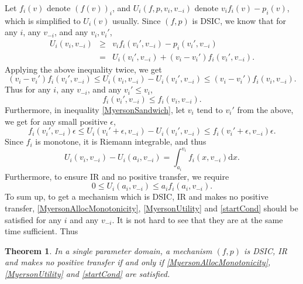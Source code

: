 \documentclass[openany]{book}
\newtheorem{theorem}{Theorem}[chapter]
\theoremstyle{remark}
\begin{document}
Let $f_i(v)$ denote $(f(v))_i$, and $U_i(f,p,v_i,v_{-i})$ denote $v_if_i(v)-p_i(v)$, which is simplified to $U_i(v)$ usually. Since $(f,p)$ is DSIC, we know that for any $i$, any $v_{-i}$, and any $v_i,v_i'$,
\begin{equation*}
    \begin{array}{rcl}
        U_i(v_i,v_{-i}) & \ge & v_if_i(v_i',v_{-i})-p_i(v_i',v_{-i}) \\
         & = & U_i(v_i',v_{-i})+(v_i-v_i')f_i(v_i',v_{-i}).
    \end{array}
\end{equation*}
Applying the above inequality twice, we get
\begin{equation}\label{MyersonSandwich}
    (v_i-v_i')f_i(v_i',v_{-i})\le U_i(v_i,v_{-i})-U_i(v_i',v_{-i})\le(v_i-v_i')f_i(v_i,v_{-i}).
\end{equation}
Thus for any $i$, any $v_{-i}$, and any $v_i'\le v_i$,
\begin{equation}\label{MyersonAllocMonotonicity}
    f_i(v_i',v_{-i})\le f_i(v_i,v_{-i}).
\end{equation}
Furthermore, in inequality \eqref{MyersonSandwich}, let $v_i$ tend to $v_i'$ from the above, we get for any small positive $\epsilon$,
\begin{equation*}
    f_i(v_i',v_{-i})\epsilon\le U_i(v_i'+\epsilon,v_{-i})-U_i(v_i',v_{-i})\le f_i(v_i'+\epsilon,v_{-i})\epsilon.
\end{equation*}
Since $f_i$ is monotone, it is Riemann integrable, and thus
\begin{equation}\label{MyersonUtility}
    U_i(v_i,v_{-i})-U_i(a_i,v_{-i})=\int_{a_i}^{v_i}f_i(x,v_{-i})\mathrm{d}x.
\end{equation}
Furthermore, to ensure IR and no positive transfer, we require
\begin{equation}\label{startCond}
    0\le U_i(a_i,v_{-i})\le a_if_i(a_i,v_{-i}).
\end{equation}
To sum up, to get a mechanism which is DSIC, IR and makes no positive transfer, \eqref{MyersonAllocMonotonicity}, \eqref{MyersonUtility} and \eqref{startCond} should be satisfied for any $i$ and any $v_{-i}$. It is not hard to see that they are at the same time sufficient. Thus
\begin{theorem}
    In a single parameter domain, a mechanism $(f,p)$ is DSIC, IR and makes no positive transfer if and only if \eqref{MyersonAllocMonotonicity}, \eqref{MyersonUtility} and \eqref{startCond} are satisfied.
\end{theorem}
\end{document}
